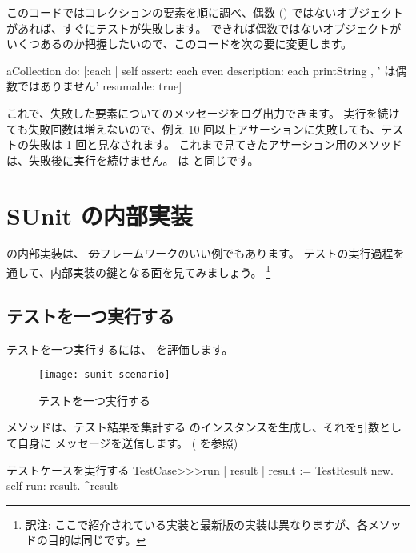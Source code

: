 \documentclass[a4paper,10pt,twoside]{book}
\begin{document}
このコードではコレクションの要素を順に調べ、偶数 () ではないオブジェクトがあれば、すぐにテストが失敗します。
できれば偶数ではないオブジェクトがいくつあるのか把握したいので、このコードを次の要に変更します。

\begin{code}{}
aCollection do:
	[:each |
	self
		assert: each even
		description: each printString , ' は偶数ではありません'
		resumable: true]
\end{code}

これで、失敗した要素についてのメッセージをログ出力できます。
実行を続けても失敗回数は増えないので、例え 10 回以上アサーションに失敗しても、テストの失敗は 1 回と見なされます。
これまで見てきたアサーション用のメソッドは、失敗後に実行を続けません。
 は  と同じです。


\section{SUnit の内部実装}

\sunit の内部実装は、 \st のフレームワークのいい例でもあります。
テストの実行過程を通して、内部実装の鍵となる面を見てみましょう。
\footnote{訳注: ここで紹介されている実装と最新版の実装は異なりますが、各メソッドの目的は同じです。}

\subsection{テストを一つ実行する}

テストを一つ実行するには、  を評価します。

\begin{figure}[tbh]
  \begin{center}
		{\texttt{[image: sunit-scenario]}}
	\caption{テストを一つ実行する}
  \end{center}
\end{figure}

 メソッドは、テスト結果を集計する  のインスタンスを生成し、それを引数として自身に  メッセージを送信します。
( を参照)

\begin{method}[tastecaserun]{テストケースを実行する}
TestCase>>>run
	| result |
	result := TestResult new.
	self run: result.
	^result
\end{method}
\end{document}
